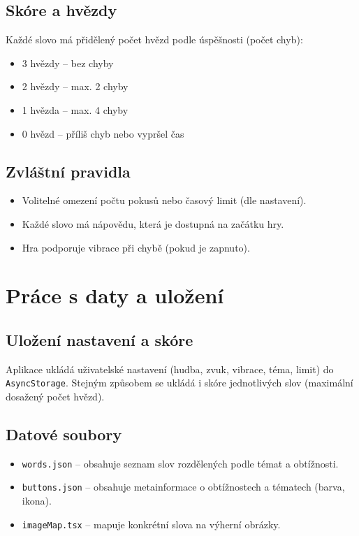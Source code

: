 \documentclass[a4paper,12pt]{article}
\begin{document}
\subsection{Skóre a hvězdy}
Každé slovo má přidělený počet hvězd podle úspěšnosti (počet chyb):
\begin{itemize}
  \item 3 hvězdy – bez chyby
  \item 2 hvězdy – max. 2 chyby
  \item 1 hvězda – max. 4 chyby
  \item 0 hvězd – příliš chyb nebo vypršel čas
\end{itemize}

\subsection{Zvláštní pravidla}
\begin{itemize}
  \item Volitelné omezení počtu pokusů nebo časový limit (dle nastavení).
  \item Každé slovo má nápovědu, která je dostupná na začátku hry.
  \item Hra podporuje vibrace při chybě (pokud je zapnuto).
\end{itemize}

\section{Práce s daty a uložení}

\subsection{Uložení nastavení a skóre}
Aplikace ukládá uživatelské nastavení (hudba, zvuk, vibrace, téma, limit) do \texttt{AsyncStorage}. Stejným způsobem se ukládá i skóre jednotlivých slov (maximální dosažený počet hvězd).

\subsection{Datové soubory}
\begin{itemize}
  \item \texttt{words.json} – obsahuje seznam slov rozdělených podle témat a obtížnosti.
  \item \texttt{buttons.json} – obsahuje metainformace o obtížnostech a tématech (barva, ikona).
  \item \texttt{imageMap.tsx} – mapuje konkrétní slova na výherní obrázky.
\end{itemize}
\end{document}
